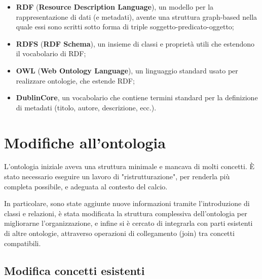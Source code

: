 \documentclass[11pt]{report} %
\begin{document}
\begin{itemize}
    \item \textbf{RDF} (\textbf{Resource Description Language}), un modello per la rappresentazione di dati (e metadati), avente una struttura graph-based nella quale essi sono scritti sotto forma di triple soggetto-predicato-oggetto;
    \item \textbf{RDFS} (\textbf{RDF Schema}), un insieme di classi e proprietà utili che estendono il vocabolario di RDF;
    \item \textbf{OWL} (\textbf{Web Ontology Language}), un linguaggio standard usato per realizzare ontologie, che estende RDF;
    \item \textbf{DublinCore}, un vocabolario che contiene termini standard per la definizione di metadati (titolo, autore, descrizione, ecc.).
\end{itemize}

\chapter{Modifiche all'ontologia}
L'ontologia iniziale aveva una struttura minimale e mancava di molti concetti.
È stato necessario eseguire un lavoro di "ristrutturazione", per renderla più completa possibile, e adeguata al contesto del calcio.

In particolare, sono state aggiunte nuove informazioni tramite l’introduzione di classi e relazioni, è stata modificata la struttura complessiva dell’ontologia per migliorarne l’organizzazione, e infine si è cercato di integrarla con parti esistenti di altre ontologie, attraverso operazioni di collegamento (join) tra concetti compatibili.
 \newpage
 \section{Modifica concetti esistenti}
\end{document}
